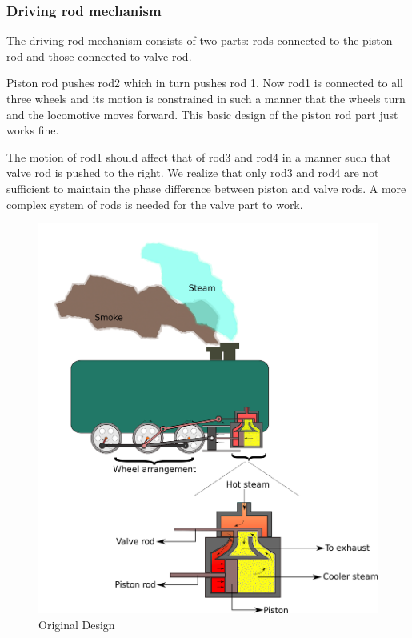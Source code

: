 \documentclass[pdftex,12pt,a4paper]{article}
\begin{document}
\subsubsection{Driving rod mechanism}
\par{The driving rod mechanism consists of two parts: rods connected to the piston rod and those connected to valve rod.}
\par{Piston rod pushes rod2 which in turn pushes rod 1. Now rod1 is connected to all three wheels and its motion is constrained in such a manner that the wheels turn and the locomotive moves forward. This basic design of the piston rod part just works fine.}

\par{The motion of rod1 should affect that of rod3 and rod4 in a manner such that valve rod is pushed to the right. We realize that only rod3 and rod4 are not sufficient to maintain the phase difference between piston and valve rods. A more complex system of rods is needed for the valve part to work.}

\begin{figure}[H]
\centering
\includegraphics[scale=.23]{../images/steameng.png}
\caption{Original Design}
\end{figure}
\end{document}
